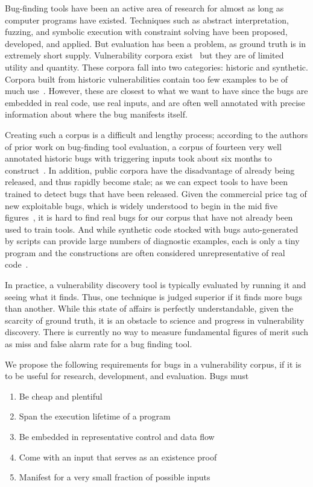 Bug-finding tools have been an active area of research for almost as long as computer programs have existed. 
Techniques such as abstract interpretation, fuzzing, and symbolic execution with constraint solving have been proposed, developed, and applied.
But evaluation has been a problem, as  ground truth is in extremely short supply.
Vulnerability corpora exist~\cite{Kass:2005} but they are of limited utility and quantity.
These corpora fall into two categories: historic and synthetic.
Corpora built from historic vulnerabilities contain too few examples to be of much use~\cite{Zitser:2004}.
However, these are closest to what we want to have since the bugs are embedded in real code, use real inputs, and are often well annotated with precise information about where the bug manifests itself.

Creating such a corpus is a difficult and lengthy process; according to the authors of prior work on bug-finding tool evaluation, a corpus of fourteen very well annotated historic bugs with triggering inputs took about six months to construct~\cite{ActuallyTim}.
In addition, public corpora have the disadvantage of already being released, and thus rapidly become stale; as we can expect tools to have been trained to detect bugs that have been released.
Given the commercial price tag of new exploitable bugs, which is widely understood to begin in the mid five figures~\cite{Tsyrklevich:2015}, it is hard to find real bugs for our corpus that have not already been used to train tools.
And while synthetic code stocked with bugs auto-generated by scripts can provide large numbers of diagnostic examples, each is only a tiny program and the constructions are often considered unrepresentative of real code~\cite{Juliet:2012,Kratkiewicz:2005}.

In practice, a vulnerability discovery tool is typically evaluated by running it and seeing what it finds. 
Thus, one technique is judged superior if it finds more bugs than another.
While this state of affairs is perfectly understandable, given the scarcity of ground truth, it is an obstacle to science and progress in vulnerability discovery.
There is currently no way to measure fundamental figures of merit such as miss and false alarm rate for a bug finding tool.

We propose the following requirements for bugs in a vulnerability corpus, if it is to be useful for research, development, and evaluation.
Bugs must

\begin{enumerate}
\item Be cheap and plentiful
\item Span the execution lifetime of a program
\item Be embedded in representative control and data flow
\item Come with an input that serves as an existence proof 
\item Manifest for a very small fraction of possible inputs
\end {enumerate}

